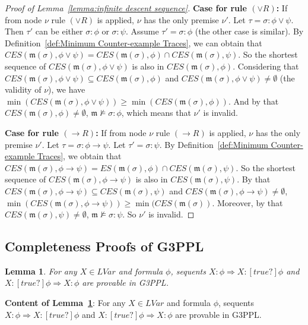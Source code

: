 \documentclass[manuscript,screen]{acmart}
\newtheorem{lemma}{Lemma}[section]
\newcommand{\mfr}[1]{\mathfrak{#1}}
\newcommand{\true}[0]{\mathit{true}}
\newcommand{\lm}[0]{\mfr{m}}
\newcommand{\EX}[0]{\textit{CES}}
\newcommand{\EXA}[0]{\textit{ES}}
\newcommand{\LVar}[0]{\mathit{LVar}}
\newcommand{\GiiiPPLcyc}[0]{\mbox{G3PPL}}
\begin{document}
\begin{proof}[Proof of Lemma~\ref{lemma:infinite descent sequence}]
    \textbf{Case for rule $(\vee R)$: }
    If from node $\nu$ rule $(\vee R)$ is applied, $\nu$ has the only premise $\nu'$. 
    Let $\tau=\sigma : \phi\vee \psi$.
    Then $\tau'$ can be either $\sigma : \phi$ or $\sigma : \psi$. 
    Assume $\tau' = \sigma : \phi$ (the other case is similar). 
    By Definition~\ref{def:Minimum Counter-example Traces}, we can obtain that $\EX(\lm(\sigma), \phi\vee \psi) = \EX(\lm(\sigma), \phi)\cap \EX(\lm(\sigma), \psi)$. 
    So the shortest sequence of $\EX(\lm(\sigma), \phi\vee \psi)$ is also in $\EX(\lm(\sigma), \phi)$. Considering that $\EX(\lm(\sigma), \phi\vee \psi)\subseteq \EX(\lm(\sigma), \phi)$ and $\EX(\lm(\sigma), \phi\vee \psi)\neq\emptyset$ (the validity of $\nu$), we have $\min(\EX(\lm(\sigma), \phi\vee \psi)) \ge \min(\EX(\lm(\sigma), \phi))$. 
    And by that $\EX(\lm(\sigma), \phi)\neq\emptyset$, $\lm\not\models \sigma : \phi$, which means that $\nu'$ is invalid. 

    \textbf{Case for rule $(\to R)$: }
    If from node $\nu$ rule $(\to R)$ is applied, $\nu$ has the only premise $\nu'$. 
    Let $\tau=\sigma : \phi\to \psi$.
    Let $\tau' = \sigma : \psi$. 
    By Definition~\ref{def:Minimum Counter-example Traces}, we obtain that $\EX(\lm(\sigma), \phi\to\psi) = \EXA(\lm(\sigma), \phi)\cap\EX(\lm(\sigma), \psi)$. 
    So the shortest sequence of $\EX(\lm(\sigma), \phi\to\psi)$ is also in $\EX(\lm(\sigma), \psi)$. 
    By that $\EX(\lm(\sigma), \phi\to\psi)\subseteq \EX(\lm(\sigma), \psi)$ and $\EX(\lm(\sigma), \phi\to\psi)\neq \emptyset$, $\min(\EX(\lm(\sigma), \phi\to\psi))\ge \min(\EX(\lm(\sigma))$. 
    Moreover, by that $\EX(\lm(\sigma), \psi)\neq\emptyset$, $\lm\not\models \sigma : \psi$. So $\nu'$ is invalid. 
\fi
 \end{proof}




\subsection{Completeness Proofs of \GiiiPPLcyc}
\label{section:Completeness Proofs of GiiiPPLcyc}

\ifx
\begin{lemma}
\label{lemma:lemma for proving rule (inv)}
For any $X\in \LVar$ and formula $\phi$, sequents $X: \phi\Rightarrow X : [\true?]\phi$ and $X : [\true?]\phi\Rightarrow X : \phi$ are provable in \GiiiPPLcyc. 
\end{lemma}
\fi

\ifx
\textbf{Content of Lemma~\ref{lemma:lemma for proving rule (inv)}}:
For any $X\in \LVar$ and formula $\phi$, sequents $X: \phi\Rightarrow X : [\true?]\phi$ and $X : [\true?]\phi\Rightarrow X : \phi$ are provable in \GiiiPPLcyc. 
\fi
\end{document}
